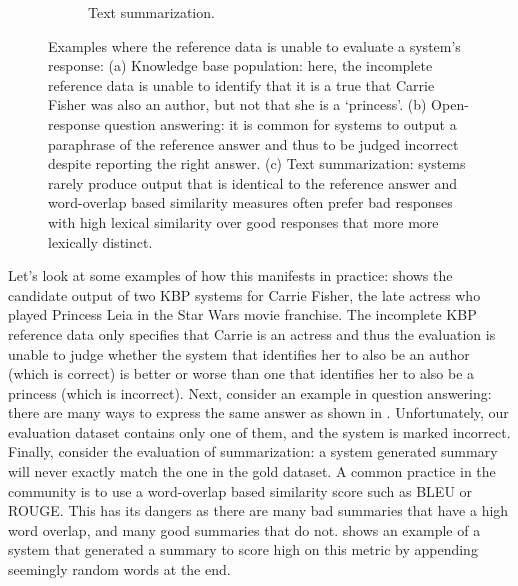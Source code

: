 \begin{figure}
\begin{subfigure}{0.65\textwidth}
    \caption{\label{fig:intro:example-summarization} Text summarization. }
  \end{subfigure}
  \caption{\label{fig:intro:examples} Examples where the reference   data is unable to evaluate a system's response:
  (a) Knowledge base population: here, the incomplete reference data is unable to identify that it is a true that Carrie Fisher was also an author, but not that she is a `princess'.
  (b) Open-response question answering: it is common for systems to output a paraphrase of the reference answer and thus to be judged incorrect despite reporting the right answer.
  (c) Text summarization: systems rarely produce output that is identical to the reference answer and word-overlap based similarity measures often prefer bad responses with high lexical similarity over good responses that more more lexically distinct.  
  }
\end{figure}

Let's look at some examples of how this manifests in practice:
 shows the candidate output of two KBP systems for Carrie Fisher, the late actress who played Princess Leia in the Star Wars movie franchise.
The incomplete KBP reference data only specifies that Carrie is an actress and thus the evaluation is unable to judge whether the system that identifies her to also be an author (which is correct) is better or worse than one that identifies her to also be a princess (which is incorrect).
Next, consider an example in question answering: there are many ways to express the same answer as shown in . Unfortunately, our evaluation dataset contains only one of them, and the system is marked incorrect.
Finally, consider the evaluation of summarization: a system generated summary will never exactly match the one in the gold dataset.
A common practice in the community is to use a word-overlap based similarity score such as BLEU or ROUGE\@.
This has its dangers as there are many bad summaries that have a high word overlap, and many good summaries that do not.  shows an example of a system that generated a summary to score high on this metric by appending seemingly random words at the end.

